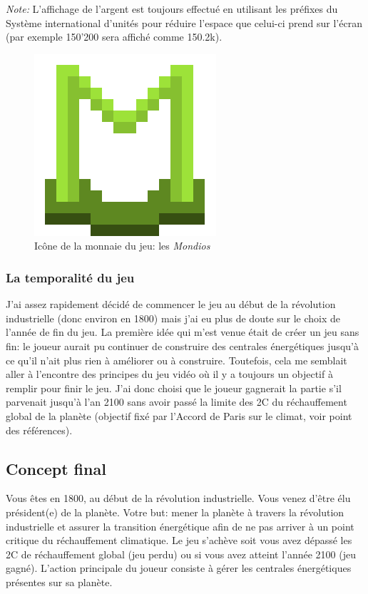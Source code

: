 \documentclass{article}
\begin{document}
		
		\textit{Note: }L'affichage de l'argent est toujours effectué en utilisant les préfixes du Système international d'unités pour réduire l'espace que celui-ci prend sur l'écran (par exemple 150'200 sera affiché comme 150.2k).
		\begin{figure}[H]
                \centerline{\includegraphics[scale=.5]{../images/mondiosLogo}}
                \caption{Icône de la monnaie du jeu: les \textit{Mondios}}
                \label{fig:mondiosLogo}
        \end{figure}
        
        
        \subsubsection{La temporalité du jeu}	
        J'ai assez rapidement décidé de commencer le jeu au début de la révolution industrielle (donc environ en 1800) mais j'ai eu plus de doute sur le choix de l'année de fin du jeu. La première idée qui m'est venue était de créer un jeu sans fin: le joueur aurait pu continuer de construire des centrales énergétiques jusqu'à ce qu'il n'ait plus rien à améliorer ou à construire. Toutefois, cela me semblait aller à l'encontre des principes du jeu vidéo où il y a toujours un objectif à remplir pour finir le jeu. J'ai donc choisi que le joueur gagnerait la partie s'il parvenait jusqu'à l'an 2100 sans avoir passé la limite des 2\degree C du réchauffement global de la planète (objectif fixé par l'Accord de Paris sur le climat, voir point \cite{objsParis2100} des références).
		
        \subsection{Concept final}
		Vous êtes en 1800, au début de la révolution industrielle. Vous venez d'être élu président(e) de la planète. Votre but: mener la planète à travers la révolution industrielle et assurer la transition énergétique afin de ne pas arriver à un point critique du réchauffement climatique. Le jeu s'achève soit vous avez dépassé les 2\degree C de réchauffement global (jeu perdu) ou si vous avez atteint l'année 2100 (jeu gagné).
        L'action principale du joueur consiste à gérer les centrales énergétiques présentes sur sa planète.
\end{document}
